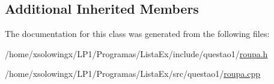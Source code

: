 \subsection*{Additional Inherited Members}


The documentation for this class was generated from the following files\+:\begin{DoxyCompactItemize}
\item 
/home/xsolowingx/\+L\+P1/\+Programas/\+Lista\+Ex/include/questao1/\hyperlink{roupa_8h}{roupa.\+h}\item 
/home/xsolowingx/\+L\+P1/\+Programas/\+Lista\+Ex/src/questao1/\hyperlink{roupa_8cpp}{roupa.\+cpp}\end{DoxyCompactItemize}
